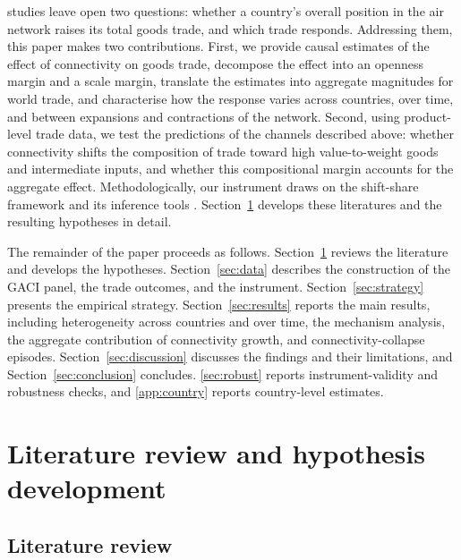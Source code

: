 studies leave open two questions: whether a country's overall position in the air network raises its total goods trade, and which trade responds. Addressing them, this paper makes two contributions. First, we provide causal estimates of the effect of connectivity on goods trade, decompose the effect into an openness margin and a scale margin, translate the estimates into aggregate magnitudes for world trade, and characterise how the response varies across countries, over time, and between expansions and contractions of the network. Second, using product-level trade data, we test the predictions of the channels described above: whether connectivity shifts the composition of trade toward high value-to-weight goods and intermediate inputs, and whether this compositional margin accounts for the aggregate effect. Methodologically, our instrument draws on the shift-share framework and its inference tools \citep{GoldsmithPinkham_2020,Adao_2019,Borusyak_2022}. Section~\ref{sec:literature} develops these literatures and the resulting hypotheses in detail.

The remainder of the paper proceeds as follows. Section~\ref{sec:literature} reviews the literature and develops the hypotheses. Section~\ref{sec:data} describes the construction of the GACI panel, the trade outcomes, and the instrument. Section~\ref{sec:strategy} presents the empirical strategy. Section~\ref{sec:results} reports the main results, including heterogeneity across countries and over time, the mechanism analysis, the aggregate contribution of connectivity growth, and connectivity-collapse episodes. Section~\ref{sec:discussion} discusses the findings and their limitations, and Section~\ref{sec:conclusion} concludes. \ref{sec:robust} reports instrument-validity and robustness checks, and
\ref{app:country} reports country-level estimates.

\section{Literature review and hypothesis development}
\label{sec:literature}
\subsection{Literature review}

